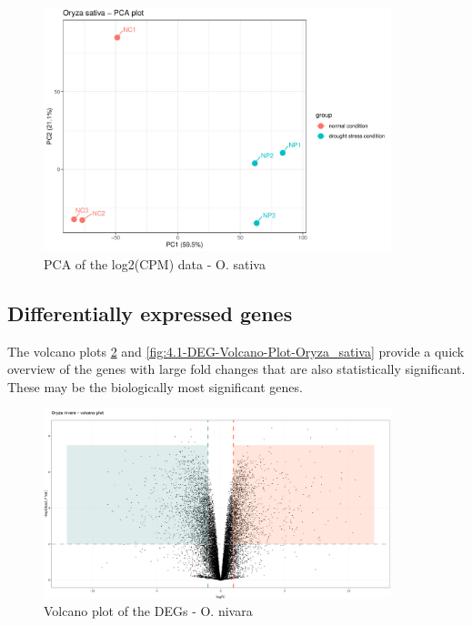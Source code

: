 \begin{figure}[htbp]
    \caption{PCA of the log2(CPM) data - O. sativa}
    \label{fig:3.2-PCA-Oryza_sativa}
    \includegraphics[width=0.9\textwidth]{../../results/plots-and-tables/3.2-PCA-Oryza_sativa}
\end{figure}


\subsection{Differentially expressed genes}

The volcano plots \ref{fig:4.1-DEG-Volcano-Plot-Oryza_nivara} and \ref{fig:4.1-DEG-Volcano-Plot-Oryza_sativa} provide a quick overview of the genes with large fold changes that are also statistically significant. These may be the biologically most significant genes.

\begin{figure}[htbp]
    \caption{Volcano plot of the DEGs - O. nivara}
    \label{fig:4.1-DEG-Volcano-Plot-Oryza_nivara}
    \includegraphics[width=0.9\textwidth]{../../results/plots-and-tables/4.1-DEG-Volcano-Plot-Oryza_nivara}
\end{figure}

